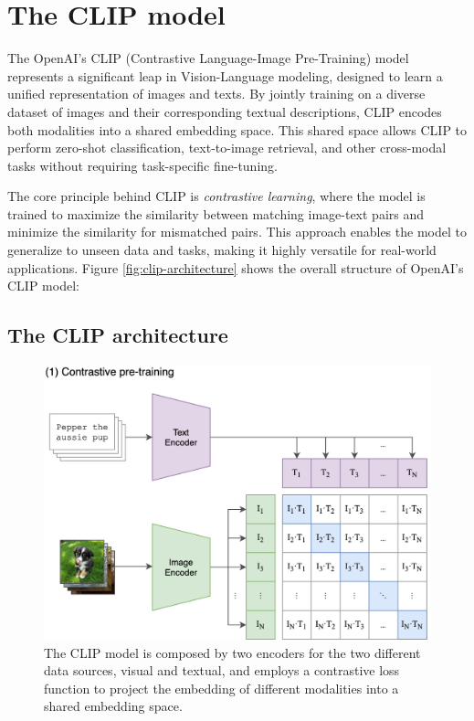 \documentclass[a4paper, oneside, english]{sapthesis}
\begin{document}
\chapter{The CLIP model} %


The OpenAI's CLIP (Contrastive Language-Image Pre-Training) model \cite{radford2021learning} represents a significant leap in Vision-Language modeling, designed to learn a unified representation of images and texts. By jointly training on a diverse dataset of images and their corresponding textual descriptions, CLIP encodes both modalities into a shared embedding space. This shared space allows CLIP to perform zero-shot classification, text-to-image retrieval, and other cross-modal tasks without requiring task-specific fine-tuning.

The core principle behind CLIP is \emph{contrastive learning}, where the model is trained to maximize the similarity between matching image-text pairs and minimize the similarity for mismatched pairs. This approach enables the model to generalize to unseen data and tasks, making it highly versatile for real-world applications. Figure \ref{fig:clip-architecture} shows the overall structure of OpenAI's CLIP model:



\section{The CLIP architecture}

\begin{figure}[h]
    \centering
    \includegraphics[width=\textwidth]{img/CLIP-structure.png}
    \caption{The CLIP model is composed by two encoders for the two different data sources, visual and textual, and employs a contrastive loss function to project the embedding of different modalities into a shared embedding space.}
    \label{fig:clip}
\end{figure}
\end{document}
